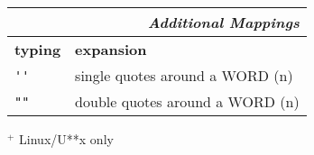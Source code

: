\documentclass[oneside,12pt,a4paper,DIV18]{scrartcl}
\begin{document}
\begin{center}
\vspace{3mm}%
%
\begin{minipage}[b]{70mm}%
\setlength{\fboxsep}{.25mm}%
\begin{spacing}{1.2}%
\begin{tabular}[]{|p{11mm}|p{55mm}|}%
\hline
\multicolumn{2}{|r|}{\textsl{Additional Mappings}}\\
\hline
\hline \textbf{typing}& \textbf{expansion}\\
\hline \verb"''"  		& single quotes around a WORD    \hfill (n)\\
\hline \verb'""'  		& double quotes around a WORD    \hfill (n)\\
\hline
\end{tabular}
\end{spacing}
\end{minipage}%
\vfill
\begin{flushleft}
\hspace{5mm}$^+$ \footnotesize{Linux/U**x only}
\end{flushleft}
\end{center}
\end{document}
